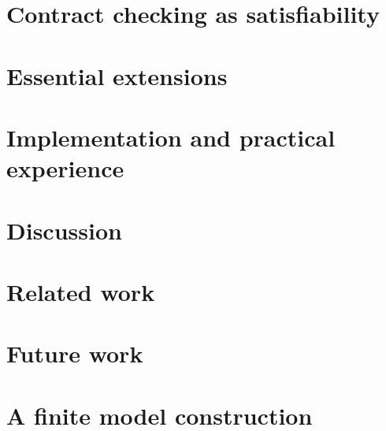 \documentclass[preprint,nocopyrightspace,draft]{sigplanconf}
\begin{document}
\section{Contract checking as satisfiability}\label{sect:soundness}
  

\section{Essential extensions}\label{sect:extensions}
  

\section{Implementation and practical experience}\label{sect:implementation}
  

\section{Discussion}\label{sect:discussion}
  

\section{Related work}\label{sect:related}
   


\section{Future work}\label{sect:future}
  






\appendix 

\section{A finite model construction}\label{sect:finite-model-proof}

\end{document}
